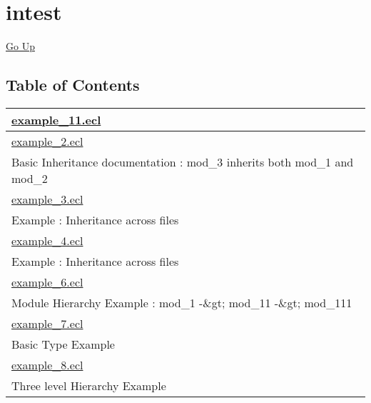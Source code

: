 \chapter*{\color{headtoc} intest}
\hypertarget{ecldoc:toc:root/intest}{}
\hyperlink{ecldoc:toc:}{Go Up}


\section*{Table of Contents}
{\renewcommand{\arraystretch}{1.5}
\begin{longtable}{|p{\textwidth}|}
\hline
\hyperlink{ecldoc:toc:intest.example_11}{example\_11.ecl} \\
\hline
\hyperlink{ecldoc:toc:intest.example_2}{example\_2.ecl} \\
Basic Inheritance documentation : mod\_3 inherits both mod\_1 and mod\_2 \\
\hline
\hyperlink{ecldoc:toc:intest.example_3}{example\_3.ecl} \\
Example : Inheritance across files \\
\hline
\hyperlink{ecldoc:toc:intest.example_4}{example\_4.ecl} \\
Example : Inheritance across files \\
\hline
\hyperlink{ecldoc:toc:intest.example_6}{example\_6.ecl} \\
Module Hierarchy Example : mod\_1 -\&gt; mod\_11 -\&gt; mod\_111 \\
\hline
\hyperlink{ecldoc:toc:intest.example_7}{example\_7.ecl} \\
Basic Type Example \\
\hline
\hyperlink{ecldoc:toc:intest.example_8}{example\_8.ecl} \\
Three level Hierarchy Example \\
\hline
\end{longtable}
}








